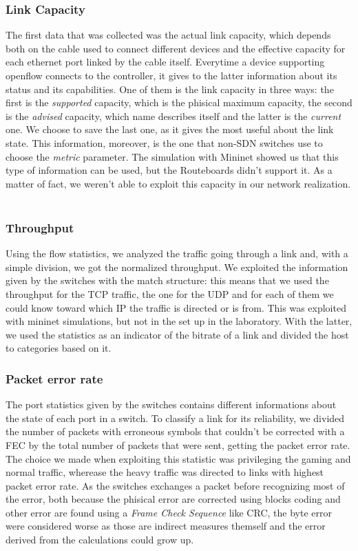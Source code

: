 \documentclass[article,10pt]{IEEEtran}
\begin{document}
\subsubsection{Link Capacity}

	The first data that was collected was the actual link capacity, which depends both on the cable used to connect
	different devices and the effective capacity for each ethernet port linked by the cable itself. Everytime a device supporting
	openflow connects to the controller, it gives to the latter information about its status and its capabilities. One of them is
	the link capacity in three ways: the first is the \textit{supported} capacity, which is the phisical maximum capacity, the second is the
	\textit{advised} capacity, which name describes itself and the latter is the \textit{current} one. We choose to save the last one,
	as it gives the most useful about the link state. This information, moreover, is the one that non-SDN switches use to choose the \textit{metric}
	parameter. The simulation with Mininet showed us that this type of information can be used, but the Routeboards didn't support it.
	As a matter of fact, we weren't able to exploit this capacity in our network realization.
		\\
		\\
  \subsubsection{Throughput}

	Using the flow statistics, we analyzed the traffic going through a link and, with a simple division, we got the normalized throughput.
	We exploited the information given by the switches with the match structure: this means that we used the throughput for the TCP traffic,
	the one for the UDP and for each of them we could know toward which IP the traffic is directed or is from. This was exploited with mininet
	simulations, but not in the set up in the laboratory. With the latter, we used the statistics as an indicator of the bitrate of a link
	and divided the host to categories based on it.
\\
\subsubsection{Packet error rate}
The port statistics given by the switches contains different informations about the state of each port in a switch. To classify a link for its
reliability, we divided the number of packets with erroneous symbols that couldn't be corrected with a FEC by the total number of packets that were sent,
getting the packet error rate. The choice we made when exploiting this statistic was privileging the gaming and normal traffic, wherease the
heavy traffic was directed to links with highest packet error rate.  As the switches exchanges a packet before recognizing most of the error, both because the
phisical error are corrected using blocks coding and other error are found using a \textit{Frame Check Sequence} like CRC, the byte error were considered worse as
those are indirect measures themself and the error derived from the calculations could grow up.
\end{document}
